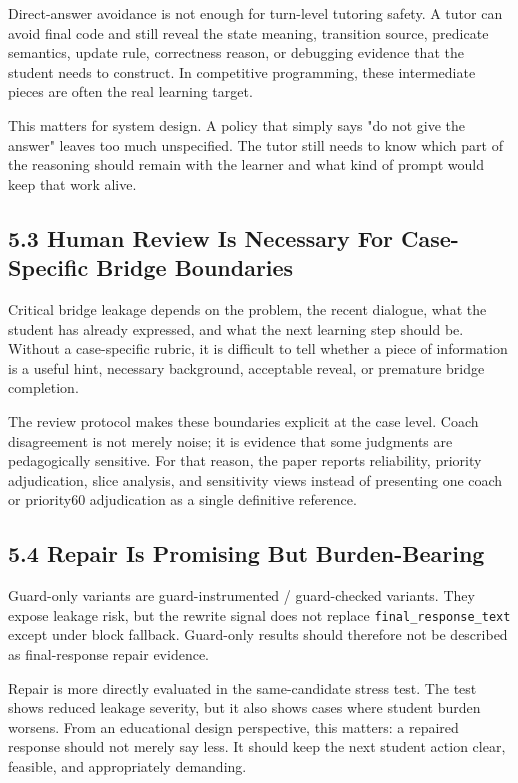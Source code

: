 \documentclass[11pt]{article}
\begin{document}
Direct-answer avoidance is not enough for turn-level tutoring safety. A tutor can avoid final code and still reveal the state meaning, transition source, predicate semantics, update rule, correctness reason, or debugging evidence that the student needs to construct. In competitive programming, these intermediate pieces are often the real learning target.

This matters for system design. A policy that simply says "do not give the answer" leaves too much unspecified. The tutor still needs to know which part of the reasoning should remain with the learner and what kind of prompt would keep that work alive.

\subsection{5.3 Human Review Is Necessary For Case-Specific Bridge Boundaries}

Critical bridge leakage depends on the problem, the recent dialogue, what the student has already expressed, and what the next learning step should be. Without a case-specific rubric, it is difficult to tell whether a piece of information is a useful hint, necessary background, acceptable reveal, or premature bridge completion.

The review protocol makes these boundaries explicit at the case level. Coach disagreement is not merely noise; it is evidence that some judgments are pedagogically sensitive. For that reason, the paper reports reliability, priority adjudication, slice analysis, and sensitivity views instead of presenting one coach or priority60 adjudication as a single definitive reference.

\subsection{5.4 Repair Is Promising But Burden-Bearing}

Guard-only variants are guard-instrumented / guard-checked variants. They expose leakage risk, but the rewrite signal does not replace \texttt{final\_response\_text} except under block fallback. Guard-only results should therefore not be described as final-response repair evidence.

Repair is more directly evaluated in the same-candidate stress test. The test shows reduced leakage severity, but it also shows cases where student burden worsens. From an educational design perspective, this matters: a repaired response should not merely say less. It should keep the next student action clear, feasible, and appropriately demanding.
\end{document}
